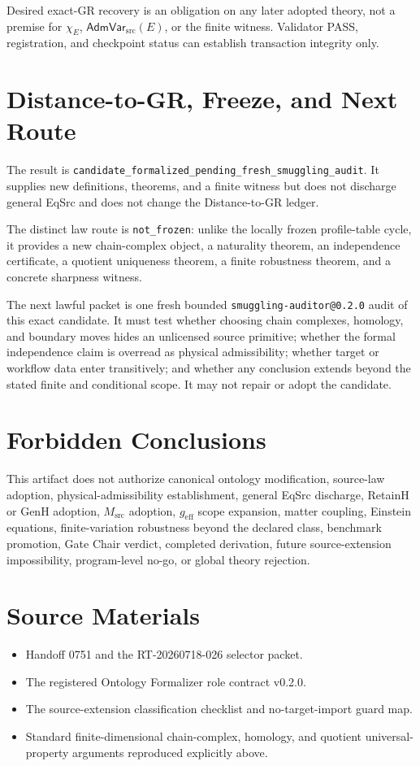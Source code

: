 \documentclass[11pt]{article}
\newcommand{\AdmVar}{\mathsf{AdmVar}_{\mathrm{src}}}
\begin{document}
Desired exact-GR recovery is an obligation on any later adopted theory, not a
premise for \(\chi_E\), \(\AdmVar(E)\), or the finite witness. Validator PASS,
registration, and checkpoint status can establish transaction integrity only.

\section{Distance-to-GR, Freeze, and Next Route}

The result is
\texttt{candidate\_formalized\_pending\_fresh\_smuggling\_audit}. It supplies
new definitions, theorems, and a finite witness but does not discharge general
EqSrc and does not change the Distance-to-GR ledger.

The distinct law route is \texttt{not\_frozen}: unlike the locally frozen
profile-table cycle, it provides a new chain-complex object, a naturality
theorem, an independence certificate, a quotient uniqueness theorem, a finite
robustness theorem, and a concrete sharpness witness.

The next lawful packet is one fresh bounded
\texttt{smuggling-auditor@0.2.0} audit of this exact candidate. It must test
whether choosing chain complexes, homology, and boundary moves hides an
unlicensed source primitive; whether the formal independence claim is
overread as physical admissibility; whether target or workflow data enter
transitively; and whether any conclusion extends beyond the stated finite and
conditional scope. It may not repair or adopt the candidate.

\section{Forbidden Conclusions}

This artifact does not authorize canonical ontology modification, source-law
adoption, physical-admissibility establishment, general EqSrc discharge,
RetainH or GenH adoption, \(M_{\mathrm{src}}\) adoption, \(g_{\mathrm{eff}}\)
scope expansion, matter coupling, Einstein equations, finite-variation
robustness beyond the declared class, benchmark promotion, Gate Chair verdict,
completed derivation, future source-extension impossibility, program-level
no-go, or global theory rejection.

\section{Source Materials}

\begin{itemize}[leftmargin=*]
  \item Handoff 0751 and the RT-20260718-026 selector packet.
  \item The registered Ontology Formalizer role contract v0.2.0.
  \item The source-extension classification checklist and no-target-import
  guard map.
  \item Standard finite-dimensional chain-complex, homology, and quotient
  universal-property arguments reproduced explicitly above.
\end{itemize}
\end{document}
